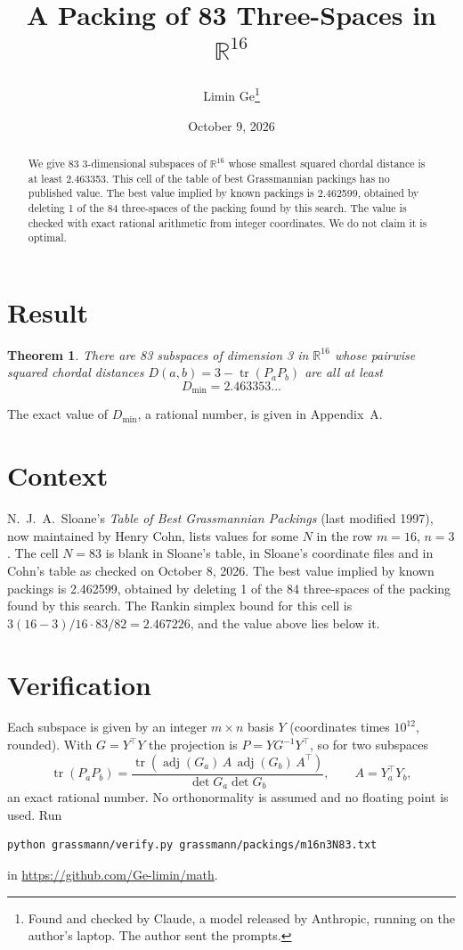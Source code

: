 \documentclass[11pt,a4paper]{article}
\title{A Packing of 83 Three-Spaces in $\mathbb{R}^{16}$}
\author{Limin Ge\thanks{Found and checked by Claude, a model released by Anthropic, running on the author's laptop. The author sent the prompts.}}
\date{October 9, 2026}
\newtheorem*{theorem}{Theorem}
\begin{document}
\maketitle
\begin{abstract}
We give 83 3-dimensional subspaces of $\mathbb{R}^{16}$ whose smallest squared chordal distance is at least 2.463353. This cell of the table of best Grassmannian packings has no published value. The best value implied by known packings is 2.462599, obtained by deleting 1 of the 84 three-spaces of the packing found by this search. The value is checked with exact rational arithmetic from integer coordinates. We do not claim it is optimal.
\end{abstract}

\section{Result}
\begin{theorem}
There are 83 subspaces of dimension 3 in $\mathbb{R}^{16}$ whose pairwise squared chordal distances $D(a,b) = 3 - \operatorname{tr}(P_aP_b)$ are all at least
\[ D_{\min} = 2.463353\ldots \]
\end{theorem}
The exact value of $D_{\min}$, a rational number, is given in Appendix~A.


\section{Context}
N.~J.~A.~Sloane's \emph{Table of Best Grassmannian Packings} (last modified 1997), now maintained by Henry Cohn, lists values for some $N$ in the row $m=16$, $n=3$. The cell $N=83$ is blank in Sloane's table, in Sloane's coordinate files and in Cohn's table as checked on October 8, 2026. The best value implied by known packings is 2.462599, obtained by deleting 1 of the 84 three-spaces of the packing found by this search. The Rankin simplex bound for this cell is $3(16-3)/16\cdot 83/82 = 2.467226$, and the value above lies below it.


\section{Verification}
Each subspace is given by an integer $m\times n$ basis $Y$ (coordinates times $10^{12}$, rounded). With $G=Y^\top Y$ the projection is $P=YG^{-1}Y^\top$, so for two subspaces
\[ \operatorname{tr}(P_aP_b)=\frac{\operatorname{tr}(\operatorname{adj}(G_a)\,A\,\operatorname{adj}(G_b)\,A^\top)}{\det G_a\det G_b},\qquad A=Y_a^\top Y_b, \]
an exact rational number. No orthonormality is assumed and no floating point is used. Run
\begin{verbatim}
python grassmann/verify.py grassmann/packings/m16n3N83.txt
\end{verbatim}
in \url{https://github.com/Ge-limin/math}.
\end{document}
